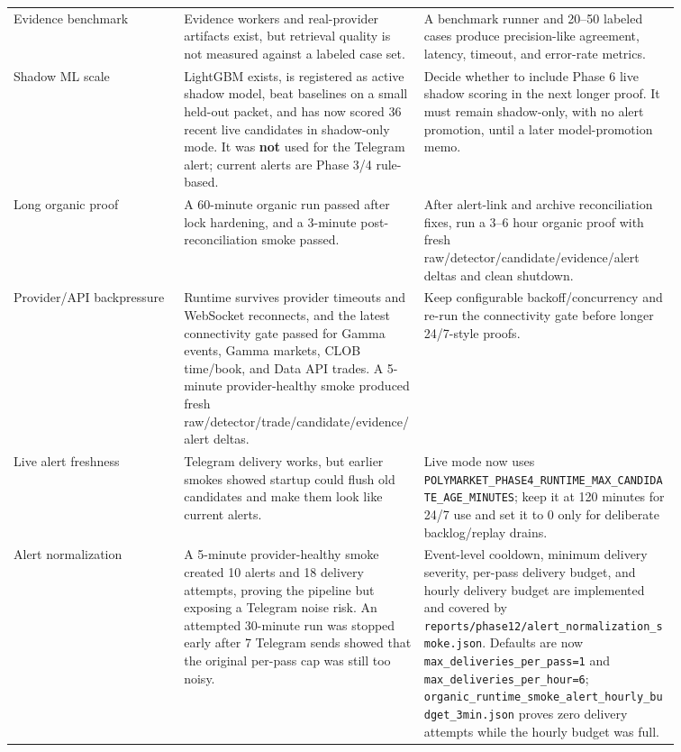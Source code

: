 \documentclass{article}
\begin{document}
\begin{longtable}{p{0.22\linewidth}p{0.31\linewidth}p{0.33\linewidth}}
Evidence benchmark & Evidence workers and real-provider artifacts exist, but retrieval quality is not measured against a labeled case set. & A benchmark runner and 20--50 labeled cases produce precision-like agreement, latency, timeout, and error-rate metrics. \\
Shadow ML scale & LightGBM exists, is registered as active shadow model, beat baselines on a small held-out packet, and has now scored 36 recent live candidates in shadow-only mode. It was \textbf{not} used for the Telegram alert; current alerts are Phase 3/4 rule-based. & Decide whether to include Phase 6 live shadow scoring in the next longer proof. It must remain shadow-only, with no alert promotion, until a later model-promotion memo. \\
Long organic proof & A 60-minute organic run passed after lock hardening, and a 3-minute post-reconciliation smoke passed. & After alert-link and archive reconciliation fixes, run a 3--6 hour organic proof with fresh raw/detector/candidate/evidence/alert deltas and clean shutdown. \\
Provider/API backpressure & Runtime survives provider timeouts and WebSocket reconnects, and the latest connectivity gate passed for Gamma events, Gamma markets, CLOB time/book, and Data API trades. A 5-minute provider-healthy smoke produced fresh raw/detector/trade/candidate/evidence/alert deltas. & Keep configurable backoff/concurrency and re-run the connectivity gate before longer 24/7-style proofs. \\
Live alert freshness & Telegram delivery works, but earlier smokes showed startup could flush old candidates and make them look like current alerts. & Live mode now uses \texttt{POLYMARKET\_PHASE4\_RUNTIME\_MAX\_CANDIDATE\_AGE\_MINUTES}; keep it at 120 minutes for 24/7 use and set it to 0 only for deliberate backlog/replay drains. \\
Alert normalization & A 5-minute provider-healthy smoke created 10 alerts and 18 delivery attempts, proving the pipeline but exposing a Telegram noise risk. An attempted 30-minute run was stopped early after 7 Telegram sends showed that the original per-pass cap was still too noisy. & Event-level cooldown, minimum delivery severity, per-pass delivery budget, and hourly delivery budget are implemented and covered by \texttt{reports/phase12/alert\_normalization\_smoke.json}. Defaults are now \texttt{max\_deliveries\_per\_pass=1} and \texttt{max\_deliveries\_per\_hour=6}; \texttt{organic\_runtime\_smoke\_alert\_hourly\_budget\_3min.json} proves zero delivery attempts while the hourly budget was full. \\
\end{longtable}
\end{document}
